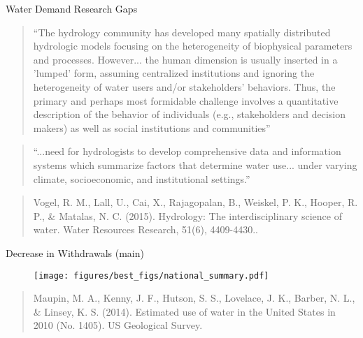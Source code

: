 \documentclass[pdf]{beamer}
\begin{document}
\begin{frame}{Water Demand Research Gaps}

{\small \begin{quote}``The hydrology community has developed many spatially distributed hydrologic models focusing on the heterogeneity of biophysical parameters and processes. However... the human dimension is usually inserted in a 'lumped' form, assuming centralized institutions and ignoring the heterogeneity of water users and/or stakeholders’ behaviors. Thus, the primary and perhaps most formidable challenge involves a quantitative description of the behavior of individuals (e.g., stakeholders and decision makers) as well as social institutions and communities'' \end{quote}}

{\small \begin{quote} ``...need for hydrologists to develop comprehensive data and information systems which summarize factors that determine water use... under varying climate, socioeconomic, and institutional settings.'' \end{quote}}

{\tiny \begin{quote} {\normalfont Vogel, R. M., Lall, U., Cai, X., Rajagopalan, B., Weiskel, P. K., Hooper, R. P., \& Matalas, N. C. (2015). Hydrology: The interdisciplinary science of water. Water Resources Research, 51(6), 4409-4430..} \end{quote}}
\end{frame}


\begin{frame}{Decrease in Withdrawals (main)}
\begin{figure}[ht]
\begin{center}
\texttt{[image: figures/best\_figs/national\_summary.pdf]}
\end{center}
\end{figure}

{\tiny \begin{quote} {\normalfont Maupin, M. A., Kenny, J. F., Hutson, S. S., Lovelace, J. K., Barber, N. L., \& Linsey, K. S. (2014). Estimated use of water in the United States in 2010 (No. 1405). US Geological Survey. } \end{quote}}

\end{frame}
\end{document}
